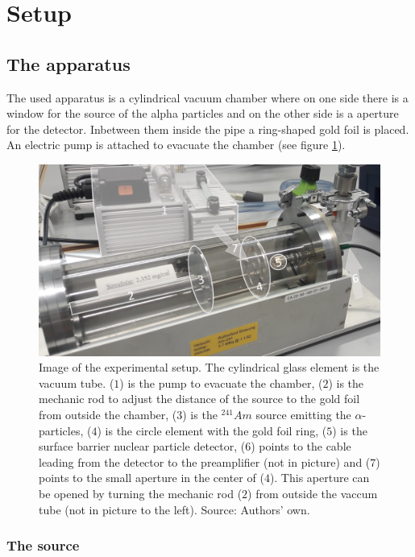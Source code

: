 \documentclass[a4paper]{article}
\begin{document}
\section{Setup}

\subsection{The apparatus}

The used apparatus is a cylindrical vacuum chamber where on one side there is a window for the source of the alpha particles and on the other side is a aperture for the detector. Inbetween them inside the pipe a ring-shaped gold foil is placed. An electric pump is attached to evacuate the chamber (see figure \ref{fig:setup}).

\begin{figure}[H]
\captionsetup{singlelinecheck=off}
\centering
\includegraphics[width=1.0\textwidth]{img/setup.jpg}
\caption[blubb]{Image of the experimental setup. The cylindrical glass element is the vacuum tube. ($1$) is the pump to evacuate the chamber, ($2$) is the mechanic rod to adjust the distance of the source to the gold foil from outside the chamber, ($3$) is the $^{241}Am$ source emitting the $\alpha$-particles, ($4$) is the circle element with the gold foil ring, ($5$) is the surface barrier nuclear particle detector, ($6$) points to the cable leading from the detector to the preamplifier (not in picture) and ($7$) points to the small aperture in the center of ($4$). This aperture can be opened by turning the mechanic rod ($2$) from outside the vaccum tube (not in picture to the left). Source: Authors' own.}
\label{fig:setup}
\end{figure}

\subsubsection{The source}
\end{document}
